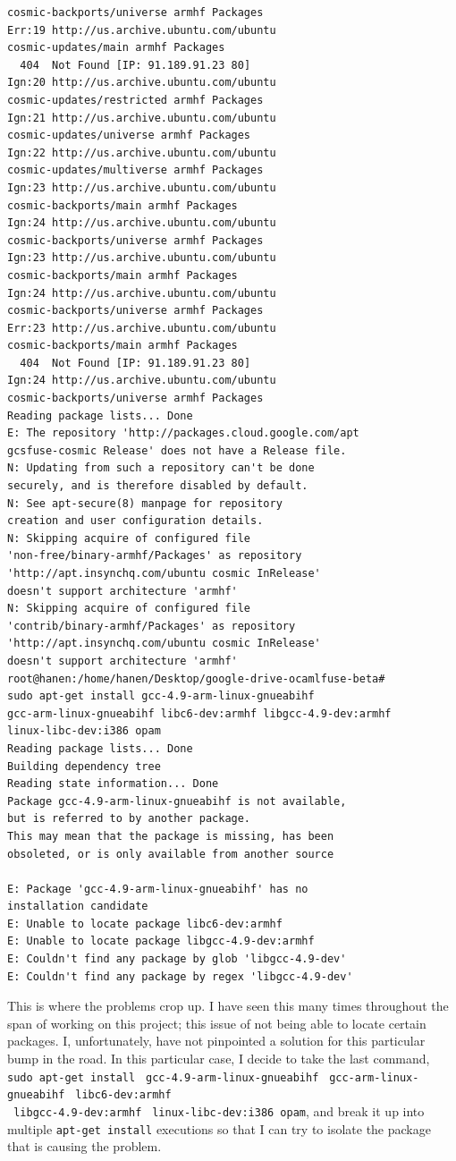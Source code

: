 \begin{verbatim}
cosmic-backports/universe armhf Packages
Err:19 http://us.archive.ubuntu.com/ubuntu 
cosmic-updates/main armhf Packages
  404  Not Found [IP: 91.189.91.23 80]
Ign:20 http://us.archive.ubuntu.com/ubuntu 
cosmic-updates/restricted armhf Packages
Ign:21 http://us.archive.ubuntu.com/ubuntu 
cosmic-updates/universe armhf Packages
Ign:22 http://us.archive.ubuntu.com/ubuntu 
cosmic-updates/multiverse armhf Packages
Ign:23 http://us.archive.ubuntu.com/ubuntu 
cosmic-backports/main armhf Packages
Ign:24 http://us.archive.ubuntu.com/ubuntu 
cosmic-backports/universe armhf Packages
Ign:23 http://us.archive.ubuntu.com/ubuntu 
cosmic-backports/main armhf Packages
Ign:24 http://us.archive.ubuntu.com/ubuntu 
cosmic-backports/universe armhf Packages
Err:23 http://us.archive.ubuntu.com/ubuntu 
cosmic-backports/main armhf Packages
  404  Not Found [IP: 91.189.91.23 80]
Ign:24 http://us.archive.ubuntu.com/ubuntu 
cosmic-backports/universe armhf Packages
Reading package lists... Done
E: The repository 'http://packages.cloud.google.com/apt 
gcsfuse-cosmic Release' does not have a Release file.
N: Updating from such a repository can't be done 
securely, and is therefore disabled by default.
N: See apt-secure(8) manpage for repository 
creation and user configuration details.
N: Skipping acquire of configured file 
'non-free/binary-armhf/Packages' as repository 
'http://apt.insynchq.com/ubuntu cosmic InRelease' 
doesn't support architecture 'armhf'
N: Skipping acquire of configured file 
'contrib/binary-armhf/Packages' as repository 
'http://apt.insynchq.com/ubuntu cosmic InRelease' 
doesn't support architecture 'armhf'
root@hanen:/home/hanen/Desktop/google-drive-ocamlfuse-beta# 
sudo apt-get install gcc-4.9-arm-linux-gnueabihf 
gcc-arm-linux-gnueabihf libc6-dev:armhf libgcc-4.9-dev:armhf 
linux-libc-dev:i386 opam
Reading package lists... Done
Building dependency tree       
Reading state information... Done
Package gcc-4.9-arm-linux-gnueabihf is not available, 
but is referred to by another package.
This may mean that the package is missing, has been 
obsoleted, or is only available from another source

E: Package 'gcc-4.9-arm-linux-gnueabihf' has no 
installation candidate
E: Unable to locate package libc6-dev:armhf
E: Unable to locate package libgcc-4.9-dev:armhf
E: Couldn't find any package by glob 'libgcc-4.9-dev'
E: Couldn't find any package by regex 'libgcc-4.9-dev'
\end{verbatim}
This is where the problems crop up. I have seen this many times throughout the span of working on this project; this issue of not being able to locate certain packages. I, unfortunately, have not pinpointed a solution for this particular bump in the road. In this particular case, I decide to take the last command, \verb|sudo apt-get install| \verb| gcc-4.9-arm-linux-gnueabihf| \verb| gcc-arm-linux-gnueabihf| \verb| libc6-dev:armhf|\\ \verb| libgcc-4.9-dev:armhf| \verb| linux-libc-dev:i386 opam|, and break it up into multiple \verb|apt-get install| executions so that I can try to isolate the package that is causing the problem.
